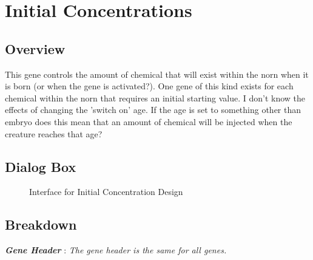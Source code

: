 \documentclass[11pt,twoside,a4paper]{article}
\begin{document}


\section{Initial Concentrations} %
\begin{minipage}{0.5\linewidth}
\subsection{Overview}
This gene controls the amount of chemical that will exist within the norn when it is born (or when the gene is activated?). One gene of this kind exists for each chemical within the norn that requires an initial starting value. I don't know the effects of changing the 'switch on' age. If the age is set to something other than embryo does this mean that an amount of chemical will be injected when the creature reaches that age?~\\
\end{minipage}
\begin{minipage}{0.1\linewidth}\end{minipage}
\begin{minipage}{0.4\linewidth}
\subsection{Dialog Box}
\begin{figure}[H]
	\centerline {} %
	\caption{Interface for Initial Concentration Design}
	\label{fig:chemical_initial}
\end{figure}
\end{minipage}

\subsection{Breakdown}

\textbf{\textit{Gene Header}} : \emph{The gene header is the same for all genes.}~\\
\end{document}
